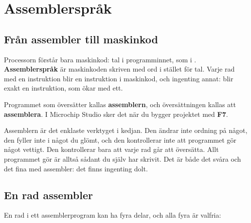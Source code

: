 %
%

\section{Assemblerspråk}
\label{c7:app:b}

\subsection{Från assembler till maskinkod}
\label{c7:b1}
Processorn förstår bara maskinkod: tal i programminnet, som i .
\textbf{Assemblerspråk} är maskinkoden skriven med ord i stället för tal. Varje rad med en
instruktion blir en instruktion i maskinkod, och ingenting annat:  blir exakt en
instruktion, som ökar  med ett.

Programmet som översätter kallas \textbf{assemblern}, och översättningen kallas att
\textbf{assemblera}. I Microchip Studio sker det när du bygger projektet med \textbf{F7}.


Assemblern är det enklaste verktyget i kedjan. Den ändrar inte ordning på något, den fyller inte i
något du glömt, och den kontrollerar inte att programmet gör något vettigt. Den kontrollerar bara
att varje rad går att översätta. Allt programmet gör är alltså sådant du själv har skrivit. Det är
både det svåra och det fina med assembler: det finns ingenting dolt.

\subsection{En rad assembler}
\label{c7:b2}
En rad i ett assemblerprogram kan ha fyra delar, och alla fyra är valfria:

